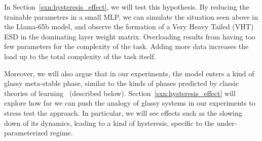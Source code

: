 

In Section~\ref{sxn:hysteresis_effect}, we will test this hypothesis.
By reducing the trainable parameters in a small MLP, we can simulate the situation seen above in the Llama-65b model,
and observe the formation of a Very Heavy Tailed (VHT) ESD in the dominating layer weight matrix.
Overloading results from having too few parameters for the complexity of the task. Adding more data increases 
the load up to the total complexity of the task itself.

Moreover, we will also argue that in our experiments,
the model enters a kind of glassy meta-stable  phase, similar to the kinds of phases predicted by
classic \STATMECH theories of learning~\cite{SST92}
(described below).
Section~\ref{sxn:hysteresis_effect} will explore how far we can push the analogy of glassy systems in our experiments to 
stress test the \SETOL approach. In particular, we will see effects such as the slowing down of its dynamics, leading to a kind 
of hysteresis, specific to the under-parameterized regime.

